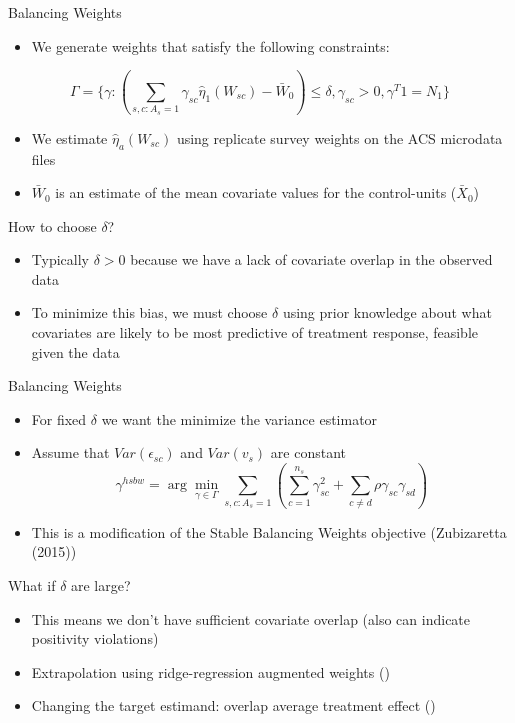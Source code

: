 \documentclass[hyperref={pdfpagelabels=false}]{beamer}
\begin{document}
\begin{frame}{Balancing Weights}
    \begin{itemize}
        \item We generate weights that satisfy the following constraints:
    \end{itemize}
    
    $$
    \Gamma = \{\gamma: (\sum_{s,c: A_s = 1}\gamma_{sc}\hat{\eta}_1(W_{sc}) - \bar{W}_0) \le \delta, \gamma_{sc} > 0, \gamma^T1 = N_1\}
    $$
    
    \begin{itemize}
        \item We estimate $\hat{\eta}_a(W_{sc})$ using replicate survey weights on the ACS microdata files \bigskip
        \item $\bar{W}_0$ is an estimate of the mean covariate values for the control-units ($\bar{X}_0$)
    \end{itemize}
\end{frame}

\begin{frame}{How to choose $\delta$?}
    \begin{itemize}
        \item Typically $\delta > 0$ because we have a lack of covariate overlap in the observed data \bigskip
        \item To minimize this bias, we must choose $\delta$ using prior knowledge about what covariates are likely to be most predictive of treatment response, feasible given the data \bigskip
    \end{itemize}
\end{frame}

\begin{frame}{Balancing Weights}
    \begin{itemize}
        \item For fixed $\delta$ we want the minimize the variance estimator \bigskip
        \item Assume that $Var(\epsilon_{sc})$ and $Var(v_s)$ are constant \bigskip
        $$
        \gamma^{hsbw} = \arg\min_{\gamma \in \Gamma}\sum_{s, c: A_s = 1}(\sum_{c = 1}^{n_s}\gamma_{sc}^2 + \sum_{c \ne d}\rho \gamma_{sc}\gamma_{sd})
        $$
        \item This is a modification of the Stable Balancing Weights objective (Zubizaretta (2015))
    \end{itemize}
\end{frame}

\begin{frame}{What if $\delta$ are large?}
    \begin{itemize}
        \item This means we don't have sufficient covariate overlap (also can indicate positivity violations) \bigskip
        \item Extrapolation using ridge-regression augmented weights (\cite{ben2018augmented}) \bigskip
        \item Changing the target estimand: overlap average treatment effect (\cite{li2018balancing})
    \end{itemize}
\end{frame}
\end{document}
